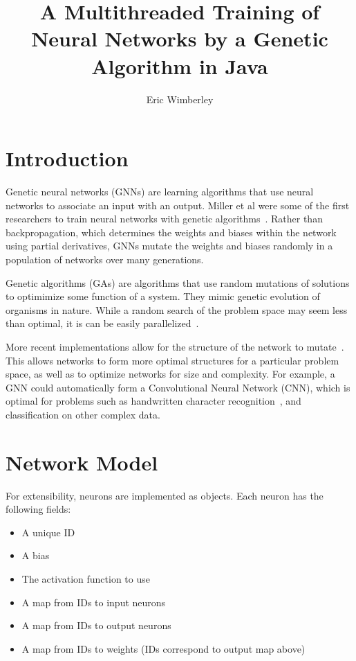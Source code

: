 \documentclass[twocolumn]{article}
\title{A Multithreaded Training of Neural Networks by a Genetic Algorithm in Java}
\author{Eric Wimberley}
\begin{document}
\maketitle

\begin{abstract}
\lipsum[1]
\end{abstract}

\section{Introduction}
Genetic neural networks (GNNs) are learning algorithms that use neural networks to associate an input with an output. Miller et al were some of the first researchers to train neural networks with genetic algorithms~\cite{MillerToddHedge}. Rather than backpropagation, which determines the weights and biases within the network using partial derivatives, GNNs mutate the weights and biases randomly in a population of networks over many generations. 

Genetic algorithms (GAs) are algorithms that use random mutations of solutions to optimimize some function of a system. They mimic genetic evolution of organisms in nature. While a random search of the problem space may seem less than optimal, it is can be easily parallelized~\cite{Tanese:1989:DGA:915973}.

More recent implementations allow for the structure of the network to mutate~\cite{LamStructure}. This allows networks to form more optimal structures for a particular problem space, as well as to optimize networks for size and complexity. For example, a GNN could automatically form a Convolutional Neural Network (CNN), which is optimal for problems such as handwritten character recognition~\cite{ConvolutionalCharacterClassification}, and classification on other complex data. 

\section{Network Model}
For extensibility, neurons are implemented as objects. Each neuron has the following fields:

\begin{itemize}
	\item A unique ID 
	\item A bias
	\item The activation function to use
	\item A map from IDs to input neurons
	\item A map from IDs to output neurons
 	\item A map from IDs to weights (IDs correspond to output map above)
\end{itemize}
\end{document}
